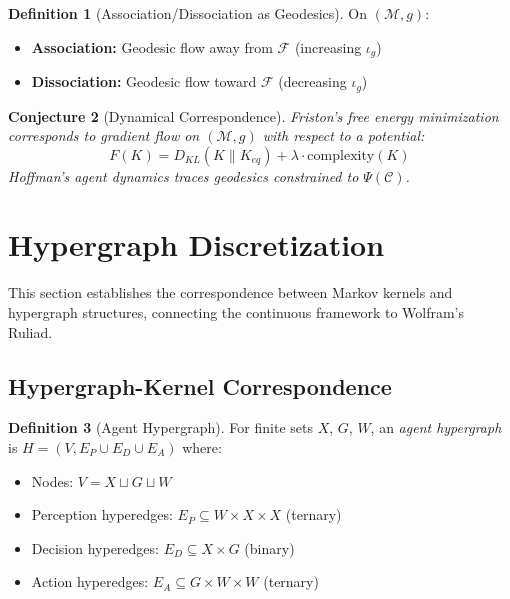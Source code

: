 \documentclass[11pt,a4paper]{article}
\theoremstyle{definition}
\newtheorem{definition}{Definition}[section]
\theoremstyle{plain}
\newtheorem{conjecture}[definition]{Conjecture}
\theoremstyle{remark}
\begin{document}
\begin{definition}[Association/Dissociation as Geodesics]
On $(\mathcal{M}, g)$:
\begin{itemize}
    \item \textbf{Association:} Geodesic flow away from $\mathcal{F}$ (increasing $\iota_g$)
    \item \textbf{Dissociation:} Geodesic flow toward $\mathcal{F}$ (decreasing $\iota_g$)
\end{itemize}
\end{definition}

\begin{conjecture}[Dynamical Correspondence]\label{conj:dynamics}
Friston's free energy minimization corresponds to gradient flow on $(\mathcal{M}, g)$ with respect to a potential:
\[
F(K) = D_{KL}(K \| K_{eq}) + \lambda \cdot \text{complexity}(K)
\]
Hoffman's agent dynamics traces geodesics constrained to $\Psi(\mathcal{C})$.
\end{conjecture}

\section{Hypergraph Discretization}\label{sec:hypergraph}

This section establishes the correspondence between Markov kernels and hypergraph structures, connecting the continuous framework to Wolfram's Ruliad.

\subsection{Hypergraph-Kernel Correspondence}

\begin{definition}[Agent Hypergraph]
For finite sets $X$, $G$, $W$, an \emph{agent hypergraph} is $H = (V, E_P \cup E_D \cup E_A)$ where:
\begin{itemize}
    \item Nodes: $V = X \sqcup G \sqcup W$
    \item Perception hyperedges: $E_P \subseteq W \times X \times X$ (ternary)
    \item Decision hyperedges: $E_D \subseteq X \times G$ (binary)
    \item Action hyperedges: $E_A \subseteq G \times W \times W$ (ternary)
\end{itemize}
\end{definition}
\end{document}
